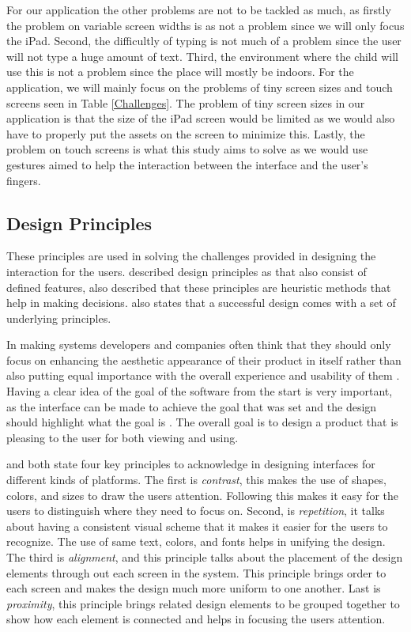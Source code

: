 For our application the other problems are not to be tackled as much, as firstly the problem on variable screen widths is as not a problem since we will only focus the iPad. Second, the difficultly of typing is not much of a problem since the user will not type a huge amount of text. Third, the environment where the child will use this is not a problem since the place will mostly be indoors. For the application, we will mainly focus on the problems of tiny screen sizes and touch screens seen in Table \ref{Challenges}. The problem of tiny screen sizes in our application is that the size of the iPad screen would be limited as we would also have to properly put the assets on the screen to minimize this. Lastly, the problem on touch screens is what this study aims to solve as we would use gestures aimed to help the interaction between the interface and the user's fingers.

\subsection{Design Principles}
These principles are used in solving the challenges provided in designing the interaction for the users.  described design principles as  that also consist of defined features,  also described that these principles are heuristic methods that help in making decisions.  also states that a successful design comes with a set of underlying principles.  

In making systems developers and companies often think that they should only focus on enhancing the aesthetic appearance of their product in itself rather than also putting equal importance with the overall experience and usability of them \cite{norman1999affordance,blasing2010android,stephanidis2012encyclopedia}. Having a clear idea of the goal of the software from the start is very important, as the interface can be made to achieve the goal that was set and the design should highlight what the goal is \cite{blair2008user}. The overall goal is to design a product that is pleasing to the user for both viewing and using.

 and  both state four key principles to acknowledge in designing interfaces for different kinds of platforms. The first is \textit{contrast}, this makes the use of shapes, colors, and sizes to draw the users attention. Following this makes it easy for the users to distinguish where they need to focus on. Second, is \textit{repetition}, it talks about having a consistent visual scheme that it makes it easier for the users to recognize. The use of same text, colors, and fonts helps in unifying the design. The third is \textit{alignment}, and this principle talks about the placement of the design elements through out each screen in the system. This principle brings order to each screen and makes the design much more uniform to one another. Last is \textit{proximity}, this principle brings related design elements to be grouped together to show how each element is connected and helps in focusing the users attention. 

